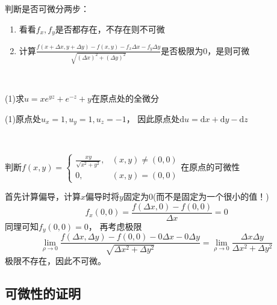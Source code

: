 \begin{note}
  判断是否可微分两步：
  \begin{enumerate}
  \item 看看$f_x,f_y$是否都存在，不存在则不可微
  \item 计算$\frac{f(x+\Delta x, y + \Delta y) - f(x,y) - f_x\Delta x - f_y\Delta y}{\sqrt{(\Delta x)^2 + (\Delta y)^2}}$是否极限为$0$，是则可微
  \end{enumerate}
\end{note}

~

\begin{exercise}[计算全微分]
  (1)求$u = xe^{yz} + e^{-z} + y$在原点处的全微分
\end{exercise}

\begin{solution}
  (1)原点处$u_x = 1, u_y = 1, u_z = -1$，
  因此原点处$\mathrm{d} u = \mathrm{d} x + \mathrm{d} y - \mathrm{d} z$
\end{solution}

~


\begin{exercise}[判断可微性]
  判断$f(x,y) =
  \begin{cases}
    \frac{xy}{\sqrt{x^2 + y^2}}, & (x,y) \neq (0,0)\\
    0, & (x,y) = (0,0)
  \end{cases}
  $在原点的可微性
\end{exercise}

\begin{solution}
  首先计算偏导，计算$x$偏导时将$y$固定为$0$(而不是固定为一个很小的值！)
  \begin{equation*}
    f_x(0,0) = \frac{f(\Delta x, 0) - f(0,0)}{\Delta x }= 0
  \end{equation*}
  同理可知$f_y(0,0) = 0$，
  再考虑极限
  \begin{equation*}
    \lim \limits _{\rho \rightarrow 0}\frac{f(\Delta x, \Delta y) - f(0,0)-0\Delta x-0 \Delta y}{\sqrt{\Delta x^2 + \Delta y^2}} = \lim \limits _{\rho \rightarrow 0}\frac{\Delta x \Delta y}{\Delta x^2 + \Delta y^2}
  \end{equation*}
  极限不存在，因此不可微。
\end{solution}

\subsection{可微性的证明}

